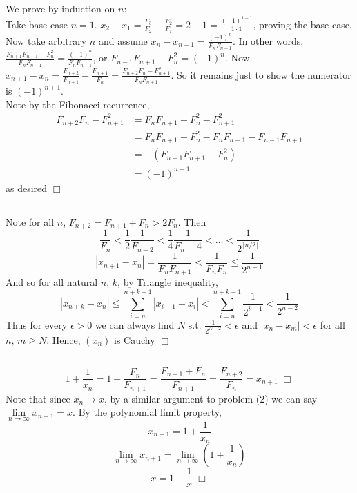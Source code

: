 \documentclass{article}
\begin{document}
\section{}
\subsection{}
We prove by induction on $n$:\\
Take base case $n=1$. $x_{2} - x_{1} = \frac{F_{3}}{F_{2}} - \frac{F_{2}}{F_{1}} = 2 - 1 = \frac{(-1)^{1+1}}{1\cdot1}$, proving the base case.\\
Now take arbitrary $n$ and assume $x_n - x_{n-1} = \frac{(-1)^n}{F_nF_{n-1}}$. In other words, $\frac{F_{n+1}F_{n-1} - F_n^2}{F_nF_{n-1}} = \frac{(-1)^n}{F_nF_{n-1}}$, or $F_{n-1}F_{n+1} - F_n^2 = (-1)^n$. Now $x_{n+1} - x_{n} = \frac{F_{n+2}}{F_{n+1}} - \frac{F_{n+1}}{F_n} = \frac{F_{n+2}F_n - F_{n+1}^2}{F_{n}F_{n+1}}$. So it remains just to show the numerator is $(-1)^{n+1}$.\\
Note by the Fibonacci recurrence,
\begin{equation*}
    \begin{split}
        F_{n+2}F_n - F_{n+1}^2 &= F_nF_{n+1} + F_n^2 - F_{n+1}^2 \\
        &= F_nF_{n+1} + F_n^2 - F_nF_{n+1} - F_{n-1}F_{n+1} \\
        &= - (F_{n-1}F_{n+1} - F_n^2) \\
        &= (-1)^{n+1}
    \end{split}
\end{equation*}
as desired $\Box$

\subsection{}
Note for all $n$, $F_{n+2} = F_{n+1} + F_n > 2F_n$. Then
$$\frac{1}{F_n} < \frac{1}{2}\frac{1}{F_{n-2}} < \frac{1}{4}\frac{1}{F_n-4} < \dots < \frac{1}{2^{\lfloor n/2 \rfloor}}$$
$$|x_{n+1} - x_n| = \frac{1}{F_nF_{n+1}} < \frac{1}{F_nF_n} \leq \frac{1}{2^{n-1}}$$
And so for all natural $n,\,k$, by Triangle inequality,
$$|x_{n+k} - x_n| \leq \sum\limits_{i=n}^{n+k-1} |x_{i+1} - x_i| < \sum\limits_{i=n}^{n+k-1} \frac{1}{2^{i-1}} < \frac{1}{2^{n-2}}$$
Thus for every $\epsilon > 0$ we can always find $N$ s.t. $\frac{1}{2^{N-2}} < \epsilon$ and $|x_n - x_m| < \epsilon$ for all $n,\,m \geq N$. Hence, $(x_n)$ is Cauchy $\Box$

\subsection{}
$$1 + \frac{1}{x_n} = 1 + \frac{F_n}{F_{n+1}} = \frac{F_{n+1}+F_n}{F_{n+1}} = \frac{F_{n+2}}{F_n} = x_{n+1} \; \Box$$
Note that since $x_n \rightarrow x$, by a similar argument to problem (2) we can say $\lim\limits_{n\rightarrow\infty} x_{n+1} = x$. By the polynomial limit property,
$$x_{n+1} = 1 + \frac{1}{x_n}$$
$$\lim\limits_{n\rightarrow\infty} x_{n+1} = \lim\limits_{n\rightarrow\infty} (1+\frac{1}{x_n})$$
$$x = 1 + \frac{1}{x} \; \Box$$
\end{document}
